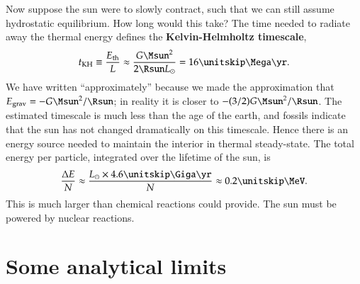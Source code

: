 Now suppose the sun were to slowly contract, such that we can still assume hydrostatic equilibrium.  How long would this take?
The time needed to radiate away the thermal energy defines the \textbf{Kelvin-Helmholtz timescale},
\begin{equation}\label{e.K-H}
t_{\mathrm{KH}} \equiv \frac{E_{\mathrm{th}}}{L} \approx \frac{G\Msun^{2}}{2\Rsun L_{\sun}} = 16 \nsp\Mega\yr.
\end{equation}
We have written ``approximately'' because we made the approximation that $E_{\mathrm{grav}}  = -G\Msun^{2}/\Rsun$; in reality it is closer to $-(3/2) G\Msun^{2}/\Rsun$.
The estimated timescale is much less than the age of the earth, and fossils indicate that the sun has not changed dramatically on this timescale.  Hence there is an energy source needed to maintain the interior in thermal steady-state. The total energy per particle, integrated over the lifetime of the sun, is
\[ \frac{\Delta E}{N} \approx \frac{L_{\sun}\times 4.6\nsp\Giga\yr}{N} \approx 0.2\nsp\MeV. \]
This is much larger than chemical reactions could provide. The sun must be powered by nuclear reactions.

\section{Some analytical limits}

